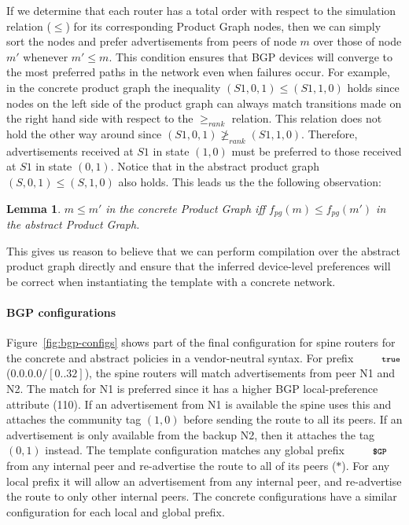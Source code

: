 \documentclass[numbers, 10pt, preprint]{sigplanconf}
\newcommand{\para}[1]{\paragraph*{\textbf{#1}}}
\newcommand{\CD}[1]{\texttt{\small #1}}  %
\newcommand{\True}{\CD{true}}
\newtheorem{lem}[thm]{Lemma}
\begin{document}
If we determine that each router has a total order with respect to the simulation relation ($\leq$) for its corresponding Product Graph nodes, then we can simply sort the nodes and prefer advertisements from peers of node $m$ over those of node $m'$ whenever $m' \leq m$. This condition ensures that BGP devices will converge to the most preferred paths in the network even when failures occur.
%
For example, in the concrete product graph the inequality $(S1,0,1) \leq (S1,1,0)$ holds since nodes on the left side of the product graph can always match transitions made on the right hand side with respect to the $\geq_{rank}$ relation. This relation does not hold the other way around since $(S1,0,1) \ngeq_{rank} (S1,1,0)$. Therefore, advertisements received at $S1$ in state $(1,0)$ must be preferred to those received at $S1$ in state $(0,1)$.
%
Notice that in the abstract product graph $(S,0,1) \leq (S,1,0)$ also holds. This leads us the the following observation:

\begin{lem}
\label{lem:preference}
$m \leq m'$ in the concrete Product Graph iff $f_{pg}(m) \leq f_{pg}(m')$ in the abstract Product Graph.
\end{lem}

This gives us reason to believe that we can perform compilation over the abstract product graph directly and ensure that the inferred device-level preferences will be correct when instantiating the template with a concrete network.



\para{BGP configurations}

Figure~\ref{fig:bgp-configs} shows part of the final configuration for spine routers for the concrete and abstract policies in a vendor-neutral syntax.
%
For prefix $\True$ ($0.0.0.0/[0..32]$), the spine routers will match advertisements from peer N1 and N2. The match for N1 is preferred since it has a higher BGP local-preference attribute (110). If an advertisement from N1 is available the spine uses this and attaches the community tag $(1,0)$ before sending the route to all its peers. If an advertisement is only available from the backup N2, then it attaches the tag $(0,1)$ instead.
%
The template configuration matches any global prefix $\CD{\$GP}$ from any internal peer and re-advertise the route to all of its peers ($*$). For any local prefix it will allow an advertisement from any internal peer, and re-advertise the route to only other internal peers. The concrete configurations have a similar configuration for each local and global prefix.
\end{document}
